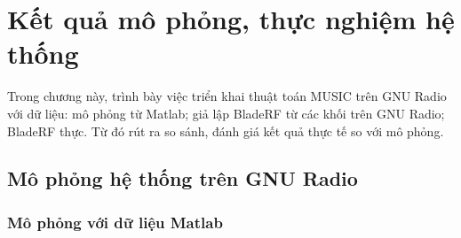 \setcounter{chapter}{2}
\chapter[\MakeUppercase{Kết quả mô phỏng, thực nghiệm hệ thống}]{Kết quả mô phỏng, thực nghiệm hệ thống}

Trong chương này, trình bày việc triển khai thuật toán MUSIC trên GNU Radio với dữ liệu: mô phỏng từ Matlab; giả lập BladeRF từ các khối trên GNU Radio; BladeRF thực. Từ đó rút ra so sánh, đánh giá kết quả thực tế so với mô phỏng.

\section{Mô phỏng hệ thống trên GNU Radio}

\subsection{Mô phỏng với dữ liệu Matlab}

